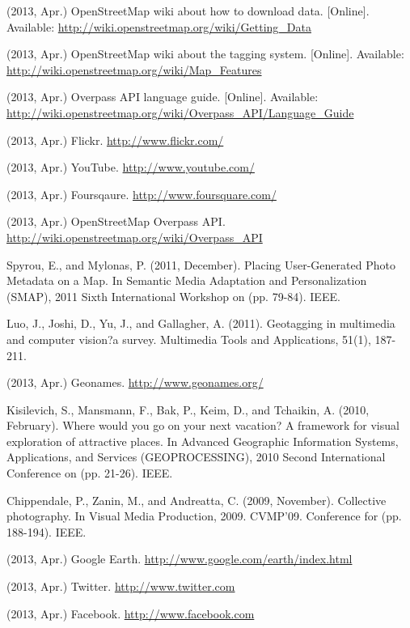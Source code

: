 \documentclass[journal]{IEEEtran}
\begin{document}
\begin{thebibliography}{1}

(2013, Apr.) OpenStreetMap wiki about how to download data. [Online]. Available: \url{http://wiki.openstreetmap.org/wiki/Getting_Data}

(2013, Apr.) OpenStreetMap wiki about the tagging system. [Online]. Available: \url{http://wiki.openstreetmap.org/wiki/Map_Features}

(2013, Apr.) Overpass API language guide. [Online]. Available: \url{http://wiki.openstreetmap.org/wiki/Overpass_API/Language_Guide}

(2013, Apr.) Flickr. \url{http://www.flickr.com/}

(2013, Apr.) YouTube. \url{http://www.youtube.com/}

(2013, Apr.) Foursqaure. \url{http://www.foursquare.com/}

(2013, Apr.) OpenStreetMap Overpass API. \url{http://wiki.openstreetmap.org/wiki/Overpass_API}

Spyrou, E., and Mylonas, P. (2011, December). Placing User-Generated Photo Metadata on a Map. In Semantic Media Adaptation and Personalization (SMAP), 2011 Sixth International Workshop on (pp. 79-84). IEEE.

Luo, J., Joshi, D., Yu, J., and Gallagher, A. (2011). Geotagging in multimedia and computer vision?a survey. Multimedia Tools and Applications, 51(1), 187-211.

(2013, Apr.) Geonames. \url{http://www.geonames.org/}

Kisilevich, S., Mansmann, F., Bak, P., Keim, D., and Tchaikin, A. (2010, February). Where would you go on your next vacation? A framework for visual exploration of attractive places. In Advanced Geographic Information Systems, Applications, and Services (GEOPROCESSING), 2010 Second International Conference on (pp. 21-26). IEEE.

Chippendale, P., Zanin, M., and Andreatta, C. (2009, November). Collective photography. In Visual Media Production, 2009. CVMP'09. Conference for (pp. 188-194). IEEE.

(2013, Apr.) Google Earth. \url{http://www.google.com/earth/index.html}

(2013, Apr.) Twitter. \url{http://www.twitter.com}

(2013, Apr.) Facebook. \url{http://www.facebook.com}

\end{thebibliography}
\end{document}
